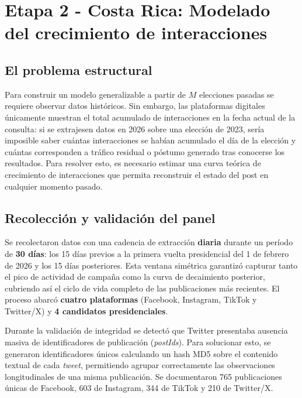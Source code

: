 \section{Etapa 2 - Costa Rica: Modelado del crecimiento de interacciones}

\subsection{El problema estructural}

Para construir un modelo generalizable a partir de $M$ elecciones pasadas se requiere observar datos históricos. Sin embargo, las plataformas digitales únicamente muestran el total acumulado de interacciones en la fecha actual de la consulta: si se extrajesen datos en 2026 sobre una elección de 2023, sería imposible saber cuántas interacciones se habían acumulado el día de la elección y cuántas corresponden a tráfico residual o póstumo generado tras conocerse los resultados. Para resolver esto, es necesario estimar una curva teórica de crecimiento de interacciones que permita reconstruir el estado del post en cualquier momento pasado.

\subsection{Recolección y validación del panel}

Se recolectaron datos con una cadencia de extracción \textbf{diaria} durante un período de \textbf{30 días}: los 15 días previos a la primera vuelta presidencial del 1 de febrero de 2026 y los 15 días posteriores. Esta ventana simétrica garantizó capturar tanto el pico de actividad de campaña como la curva de decaimiento posterior, cubriendo así el ciclo de vida completo de las publicaciones más recientes. El proceso abarcó \textbf{cuatro plataformas} (Facebook, Instagram, TikTok y Twitter/X) y \textbf{4 candidatos presidenciales}.

Durante la validación de integridad se detectó que Twitter presentaba ausencia masiva de identificadores de publicación (\textit{postIds}). Para solucionar esto, se generaron identificadores únicos calculando un hash MD5 sobre el contenido textual de cada \textit{tweet}, permitiendo agrupar correctamente las observaciones longitudinales de una misma publicación. Se documentaron 765 publicaciones únicas de Facebook, 603 de Instagram, 344 de TikTok y 210 de Twitter/X.

